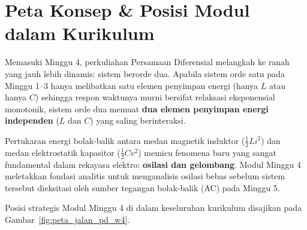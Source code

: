 \documentclass[11pt,a4paper]{article}
\theoremstyle{definition}
\begin{document}
\newpage

\section{Peta Konsep \& Posisi Modul dalam Kurikulum}

Memasuki Minggu 4, perkuliahan Persamaan Diferensial melangkah ke ranah yang jauh lebih dinamis: sistem berorde dua. Apabila sistem orde satu pada Minggu 1--3 hanya melibatkan satu elemen penyimpan energi (hanya $L$ atau hanya $C$) sehingga respon waktunya murni bersifat relaksasi eksponensial monotonik, sistem orde dua memuat \textbf{dua elemen penyimpan energi independen} ($L$ dan $C$) yang saling berinteraksi.

Pertukaran energi bolak-balik antara medan magnetik induktor ($\frac{1}{2} L i^2$) dan medan elektrostatik kapasitor ($\frac{1}{2} C v^2$) memicu fenomena baru yang sangat fundamental dalam rekayasa elektro: \textbf{osilasi dan gelombang}. Modul Minggu 4 meletakkan fondasi analitis untuk menganalisis osilasi bebas sebelum sistem tersebut dieksitasi oleh sumber tegangan bolak-balik (AC) pada Minggu 5.

Posisi strategis Modul Minggu 4 di dalam keseluruhan kurikulum disajikan pada Gambar~\ref{fig:peta_jalan_pd_w4}.
\end{document}
